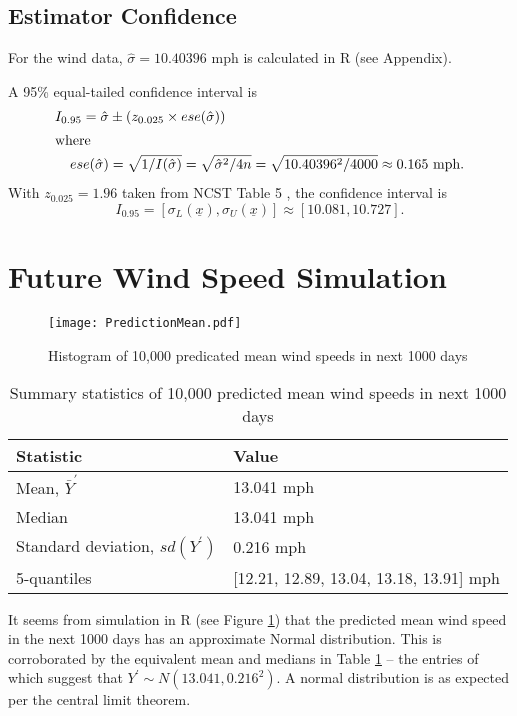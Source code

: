 \documentclass[11pt]{article}
\begin{document}
\subsection{Estimator Confidence}

For the wind data, $ \hat\sigma = 10.40396 \text{ mph}$ is calculated in R (see Appendix).

A 95\% equal-tailed confidence interval is
\begin{align*}
    I_{0.95} = \hat\sigma &\pm \left(z_{0.025} \times ese(\hat\sigma)\right) \\
\intertext{where}
    ese(\hat\sigma) &= \sqrt{1/I(\hat\sigma)} = \sqrt{\hat\sigma^2/4n} = \sqrt{10.40396^2 / 4000} \approx 0.165 \text{ mph.}
\end{align*}
With $z_{0.025} = 1.96$ taken from NCST Table 5 \cite{NCST}, the confidence interval is
$$ I_{0.95} = [\sigma_L(\underline{x}), \sigma_U(\underline{x})] \approx [ 10.081 , 10.727 ] \text{.}$$

\section{Future Wind Speed Simulation}

\begin{figure}[ht]
    \centering
	\texttt{[image: PredictionMean.pdf]}
    \caption{Histogram of 10,000 predicated mean wind speeds in next 1000 days}
    \label{fig:mean_hist}
\end{figure}

\begin{table}[ht]
    \centering
    \begin{tabular}{ll}
    Statistic & Value \\ \hline
    Mean, $\bar Y^\prime$ \rule{0pt}{3ex} & 13.041 mph \\
    Median & 13.041 mph \\
    Standard deviation, $sd(Y^\prime)$ & 0.216 mph \\
    5-quantiles & [12.21, 12.89, 13.04, 13.18, 13.91] mph
    \end{tabular}
    \caption{Summary statistics of 10,000 predicted mean wind speeds in next 1000 days}
    \label{t:mean}
\end{table}

It seems from simulation in R (see Figure \ref{fig:mean_hist}) that the predicted mean
wind speed in the next 1000 days has an approximate Normal distribution.
This is corroborated by the equivalent mean and medians in Table
\ref{t:mean} -- the entries of which suggest that
$Y^\prime \sim N(13.041, 0.216^2)$. A normal distribution is as expected
per the central limit theorem.
\end{document}
